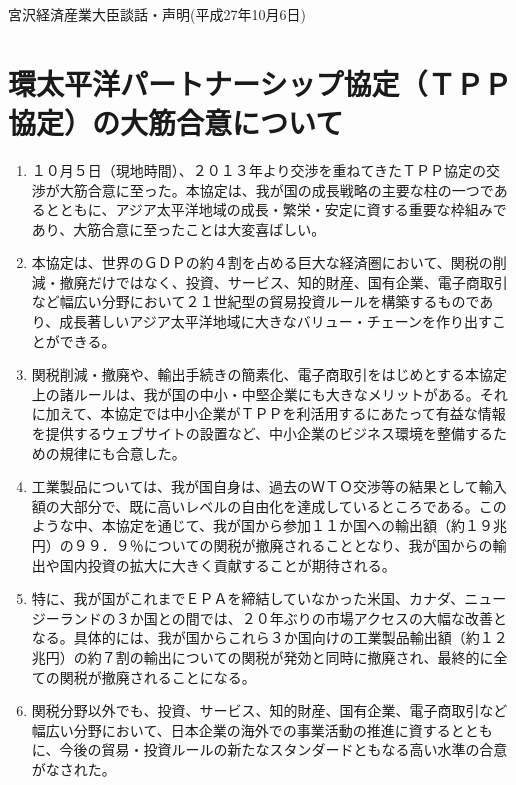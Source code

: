 \clearpage
\begin {center}
宮沢経済産業大臣談話・声明(平成27年10月6日)
\end {center}

\section {環太平洋パートナーシップ協定（ＴＰＰ協定）の大筋合意について}
\begin {enumerate}
\item １０月５日（現地時間）、２０１３年より交渉を重ねてきたＴＰＰ協定の交渉が大筋合意に至った。本協定は、我が国の成長戦略の主要な柱の一つであるとともに、アジア太平洋地域の成長・繁栄・安定に資する重要な枠組みであり、大筋合意に至ったことは大変喜ばしい。

\item 本協定は、世界のＧＤＰの約４割を占める巨大な経済圏において、関税の削減・撤廃だけではなく、投資、サービス、知的財産、国有企業、電子商取引など幅広い分野において２１世紀型の貿易投資ルールを構築するものであり、成長著しいアジア太平洋地域に大きなバリュー・チェーンを作り出すことができる。

\item 関税削減・撤廃や、輸出手続きの簡素化、電子商取引をはじめとする本協定上の諸ルールは、我が国の中小・中堅企業にも大きなメリットがある。それに加えて、本協定では中小企業がＴＰＰを利活用するにあたって有益な情報を提供するウェブサイトの設置など、中小企業のビジネス環境を整備するための規律にも合意した。

\item 工業製品については、我が国自身は、過去のＷＴＯ交渉等の結果として輸入額の大部分で、既に高いレベルの自由化を達成しているところである。このような中、本協定を通じて、我が国から参加１１か国への輸出額（約１９兆円）の９９．９％についての関税が撤廃されることとなり、我が国からの輸出や国内投資の拡大に大きく貢献することが期待される。

\item 特に、我が国がこれまでＥＰＡを締結していなかった米国、カナダ、ニュージーランドの３か国との間では、２０年ぶりの市場アクセスの大幅な改善となる。具体的には、我が国からこれら３か国向けの工業製品輸出額（約１２兆円）の約７割の輸出についての関税が発効と同時に撤廃され、最終的に全ての関税が撤廃されることになる。

\item 関税分野以外でも、投資、サービス、知的財産、国有企業、電子商取引など幅広い分野において、日本企業の海外での事業活動の推進に資するとともに、今後の貿易・投資ルールの新たなスタンダードともなる高い水準の合意がなされた。


\end{enumerate}

